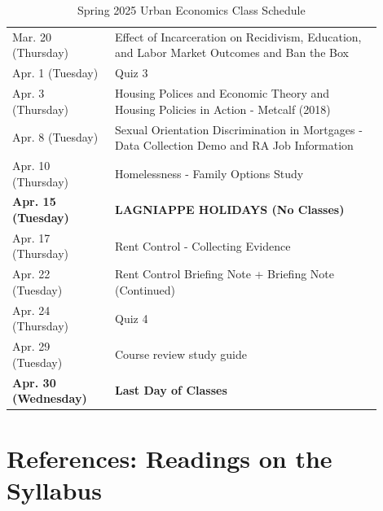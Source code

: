 \documentclass[11pt,letterpaper,final]{article}
\begin{document}
\begin{table}[H]
\begin{tabular}{@{}p{0.25\linewidth}p{0.65\linewidth}@{}}
Mar. 20 (Thursday) & Effect of Incarceration on Recidivism, Education, and Labor Market Outcomes and Ban the Box\\
Apr. 1 (Tuesday) & Quiz 3 \\
Apr. 3 (Thursday) & Housing Polices and Economic Theory and Housing Policies in Action - Metcalf (2018) \\
Apr. 8 (Tuesday) & Sexual Orientation Discrimination in Mortgages - Data Collection Demo and RA Job Information \\
Apr. 10 (Thursday) & Homelessness - Family Options Study \\
\textbf{Apr. 15 (Tuesday)} & \textbf{LAGNIAPPE HOLIDAYS (No Classes)} \\
Apr. 17 (Thursday) & Rent Control - Collecting Evidence \\
Apr. 22 (Tuesday) & Rent Control Briefing Note + Briefing Note (Continued) \\
Apr. 24 (Thursday) & Quiz 4 \\
Apr. 29 (Tuesday) & Course review study guide \\
\textbf{Apr. 30 (Wednesday)} & \textbf{Last Day of Classes} \\

\end{tabular}
\caption{Spring 2025 Urban Economics Class Schedule}
\end{table}
  

\newpage
\section{References: Readings on the Syllabus}
\def\refname{}



\end{document}
